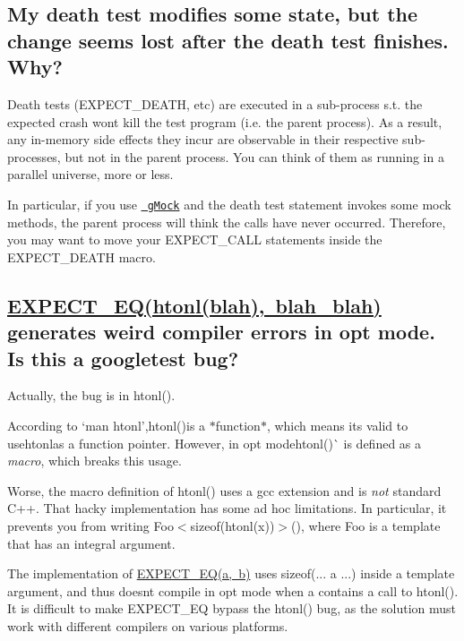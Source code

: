 \subsection*{My death test modifies some state, but the change seems lost after the death test finishes. Why?}

Death tests ({\ttfamily E\+X\+P\+E\+C\+T\+\_\+\+D\+E\+A\+TH}, etc) are executed in a sub-\/process s.\+t. the expected crash won\textquotesingle{}t kill the test program (i.\+e. the parent process). As a result, any in-\/memory side effects they incur are observable in their respective sub-\/processes, but not in the parent process. You can think of them as running in a parallel universe, more or less.

In particular, if you use \href{../../googlemock}{\texttt{ g\+Mock}} and the death test statement invokes some mock methods, the parent process will think the calls have never occurred. Therefore, you may want to move your {\ttfamily E\+X\+P\+E\+C\+T\+\_\+\+C\+A\+LL} statements inside the {\ttfamily E\+X\+P\+E\+C\+T\+\_\+\+D\+E\+A\+TH} macro.

\subsection*{\mbox{\hyperlink{_obj__test_2lib_2googletest-release-1_88_81_2googletest_2include_2gtest_2gtest_8h_a4159019abda84f5366acdb7604ff220a}{E\+X\+P\+E\+C\+T\+\_\+\+E\+Q(htonl(blah), blah\+\_\+blah)}} generates weird compiler errors in opt mode. Is this a googletest bug?}

Actually, the bug is in {\ttfamily htonl()}.

According to `\textquotesingle{}man htonl'{\ttfamily ,}htonl(){\ttfamily is a $\ast$function$\ast$, which means it\textquotesingle{}s valid to use}htonl{\ttfamily as a function pointer. However, in opt mode}htonl()\`{} is defined as a {\itshape macro}, which breaks this usage.

Worse, the macro definition of {\ttfamily htonl()} uses a {\ttfamily gcc} extension and is {\itshape not} standard C++. That hacky implementation has some ad hoc limitations. In particular, it prevents you from writing {\ttfamily Foo$<$sizeof(htonl(x))$>$()}, where {\ttfamily Foo} is a template that has an integral argument.

The implementation of {\ttfamily \mbox{\hyperlink{_obj__test_2lib_2googletest-release-1_88_81_2googletest_2include_2gtest_2gtest_8h_a4159019abda84f5366acdb7604ff220a}{E\+X\+P\+E\+C\+T\+\_\+\+E\+Q(a, b)}}} uses {\ttfamily sizeof(... a ...)} inside a template argument, and thus doesn\textquotesingle{}t compile in opt mode when {\ttfamily a} contains a call to {\ttfamily htonl()}. It is difficult to make {\ttfamily E\+X\+P\+E\+C\+T\+\_\+\+EQ} bypass the {\ttfamily htonl()} bug, as the solution must work with different compilers on various platforms.

